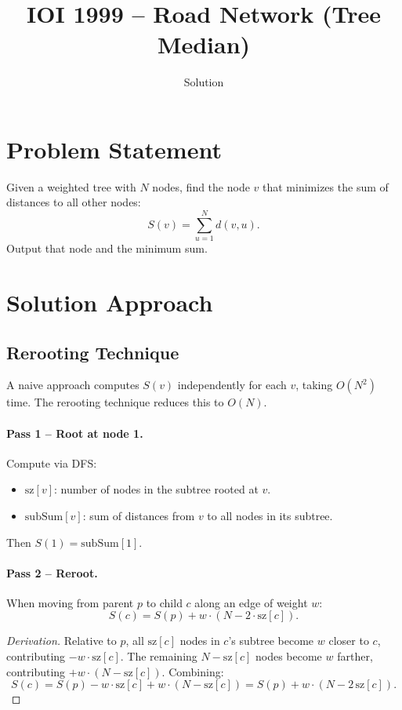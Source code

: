 \documentclass[11pt,a4paper]{article}
\title{IOI 1999 -- Road Network (Tree Median)}
\author{Solution}
\date{}
\begin{document}
\maketitle

\section{Problem Statement}

Given a weighted tree with $N$ nodes, find the node $v$ that minimizes the sum of
distances to all other nodes:
\[
  S(v) = \sum_{u=1}^{N} d(v, u).
\]
Output that node and the minimum sum.

\section{Solution Approach}

\subsection{Rerooting Technique}

A naive approach computes $S(v)$ independently for each $v$, taking $O(N^2)$ time.
The rerooting technique reduces this to $O(N)$.

\paragraph{Pass 1 -- Root at node 1.} Compute via DFS:
\begin{itemize}
  \item $\mathrm{sz}[v]$: number of nodes in the subtree rooted at $v$.
  \item $\mathrm{subSum}[v]$: sum of distances from $v$ to all nodes in its subtree.
\end{itemize}
Then $S(1) = \mathrm{subSum}[1]$.

\paragraph{Pass 2 -- Reroot.} When moving from parent $p$ to child $c$ along an
edge of weight $w$:
\[
  S(c) = S(p) + w \cdot (N - 2 \cdot \mathrm{sz}[c]).
\]

\begin{proof}[Derivation]
Relative to $p$, all $\mathrm{sz}[c]$ nodes in $c$'s subtree become $w$ closer
to $c$, contributing $-w \cdot \mathrm{sz}[c]$. The remaining $N - \mathrm{sz}[c]$
nodes become $w$ farther, contributing $+w \cdot (N - \mathrm{sz}[c])$. Combining:
\[
  S(c) = S(p) - w \cdot \mathrm{sz}[c] + w \cdot (N - \mathrm{sz}[c])
       = S(p) + w \cdot (N - 2\,\mathrm{sz}[c]).
\]
\end{proof}
\end{document}
